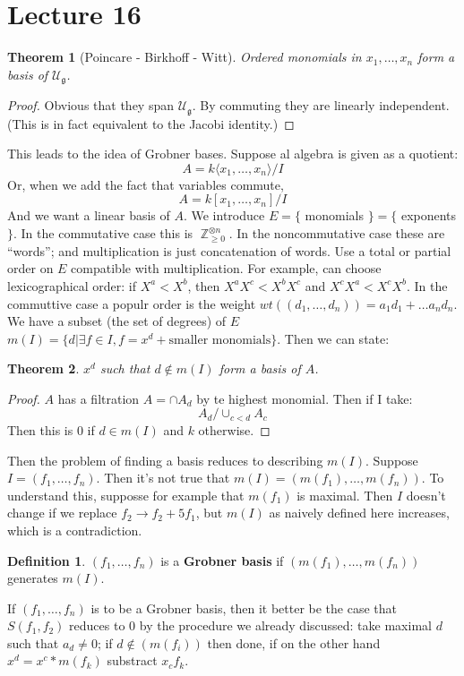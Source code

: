 \documentclass[12 pt]{article}
\DeclareMathOperator {\Z} {\mathbb{Z}}
\theoremstyle{plain}
\newtheorem*{thm*}{Theorem}
\theoremstyle{definition}
\newtheorem{defn}{Definition}
\theoremstyle{remark}
\begin{document}
\section*{Lecture 16}
\begin{thm*} [Poincare - Birkhoff - Witt]
Ordered monomials in $x_1, \dots , x_n$ form a basis of $\mathcal{U}_{\mathfrak{g}}$.
\end{thm*}
\begin{proof}
Obvious that they span $\mathcal{U}_{\mathfrak{g}}$. By commuting they are linearly independent. (This is in fact equivalent to the Jacobi identity.)
\end{proof}
This leads to the idea of Grobner bases. Suppose al algebra is given as a quotient:
\[        A = k \langle x_1, \dots , x_n \rangle / I          \]
Or, when we add the fact that variables commute,
\[        A = k [x_1, \dots , x_n] /I     \]
And we want a linear basis of $A$. We introduce $E = \{$ monomials $\} = \{$ exponents $\}$. In the commutative case this is $\Z_{\geq 0}^{\otimes n}$. In the noncommutative case these are ``words''; and multiplication is just concatenation of words. Use a total or partial order on $E$ compatible with multiplication. For example, can choose lexicographical order: if $X^a < X^b$, then $X^a X^c < X^b X^c$ and $X^c X^a < X^c X^b$. In the commuttive case a populr order is the weight $wt((d_1, \dots , d_n)) = a_1 d_1 + \dots a_n d_n$. We have a subset (the set of degrees) of $E$ $m(I) = \{ d | \exists f \in I, f = x^d + \text{smaller monomials} \}$. Then we can state:
\begin{thm*}
$x^d$ such that $d \not \in m(I)$ form a basis of $A$.
\end{thm*}
\begin{proof}
$A$ has a filtration $A = \cap A_d$ by te highest monomial. Then if I take:
\[       A_d / \cup_{c < d} A_c        \]
Then this is 0 if $d \in m(I)$ and $k$ otherwise.
\end{proof}
Then the problem of finding a basis reduces to describing $m(I)$. Suppose $I = (f_1, \dots , f_n)$. Then it's not true that $m(I) = (m(f_1), \dots , m(f_n))$. To understand this, supposse for example that $m(f_1)$ is maximal. Then $I$ doesn't change if we replace $f_2 \to f_2 + 5 f_1$, but $m(I)$ as naively defined here increases, which is a contradiction.
\begin{defn}
$(f_1, \dots , f_n)$ is a \textbf{Grobner basis} if $(m(f_1), \dots , m(f_n))$ generates $m(I)$.
\end{defn}
If $(f_1, \dots , f_n)$ is to be a Grobner basis, then it better be the case that $S(f_1, f_2)$ reduces to 0 by the procedure we already discussed: take maximal $d$ such that $a_d \neq 0$; if $d \not \in (m(f_i))$ then done, if on the other hand $x^d = x^c * m(f_k)$ substract $x_c f_k$.
\end{document}

